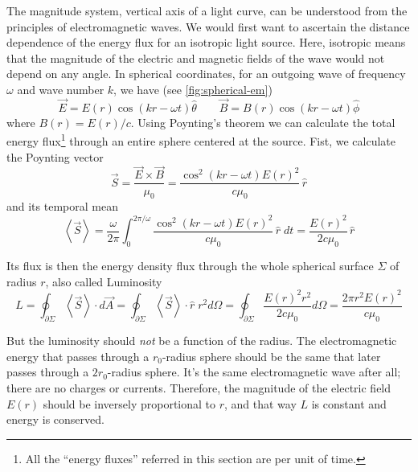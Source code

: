 	The magnitude system, vertical axis of a light curve, can be understood from the principles of electromagnetic waves.
	We would first want to ascertain the distance dependence of the energy flux for an isotropic light source.
	Here, isotropic means that the magnitude of the electric and magnetic fields of the wave would not depend on any angle.
	In spherical coordinates, for an outgoing wave of frequency $\omega$ and wave number $k$, we have (see \autoref{fig:spherical-em})
	\begin{equation}
		\vec E = E(r) \cos(kr-\omega t) \hat\theta \qquad \vec B = B(r) \cos(kr-\omega t) \hat\phi
	\end{equation}
	where $B(r)=E(r)/c$. Using Poynting's theorem \citep[\S8.1.2]{Griffiths2013} we can calculate the total energy flux\footnote{All the \enquote{energy fluxes} referred in this section are per unit of time.} through an entire sphere centered at the source.
	Fist, we calculate the Poynting vector 
	\begin{equation}
		\vec S = \frac{\vec E \times \vec B}{\mu_0} = \frac{\cos^2(kr-\omega t)E(r)^2}{c\mu_0} \,\hat r
	\end{equation}
	and its temporal mean 
	\begin{equation}
		\left<\vec S \right> = \frac{\omega}{2\pi}\int_0^{2\pi/\omega} \frac{\cos^2(kr-\omega t)E(r)^2}{c\mu_0} \,\hat r\;dt = \frac{E(r)^2}{2c\mu_0}\,\hat r \label{eq:poynting}
	\end{equation}

	Its flux is then the energy density flux through the whole spherical surface $\Sigma$ of radius $r$, also called Luminosity
	\begin{equation}
		L = \oint_{\partial\Sigma} \left<\vec S\right> \cdot d\vec{A} 
			= \oint_{\partial\Sigma} \left<\vec S\right> \cdot \hat r \; r^2 d\Omega
			= \oint_{\partial\Sigma} \frac{E(r)^2 r^2}{2c\mu_0} d\Omega
			= \frac{2\pi r^2  E(r)^2}{c\mu_0} \label{eq:luminosity}
	\end{equation}

	But the luminosity should \textit{not} be a function of the radius. 
	The electromagnetic energy that passes through a $r_0$-radius sphere should be the same that later passes through a $2r_0$-radius sphere.
	It's the same electromagnetic wave after all; there are no charges or currents. 
	Therefore, the magnitude of the electric field $E(r)$ should be inversely proportional to $r$, and that way $L$ is constant and energy is conserved.
	
